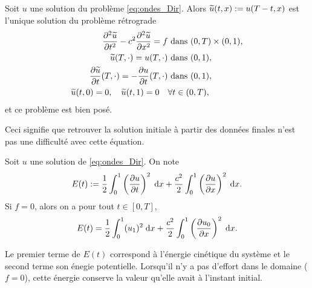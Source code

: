 \documentclass[12pt,a4paper,twoside]{article}
\begin{document}




\begin{proposition}
  Soit $u$ une solution du probl\`eme \eqref{eq:ondes_Dir}.
  Alors $\widetilde{u}(t,x) := u(T-t,x)$ est l'unique solution du probl\`eme
  r\'etrograde
  \begin{align*}
    \dfrac{\partial^2 \widetilde{u}}{\partial t^2} - c^2 \dfrac{\partial^2 \widetilde{u}}{\partial x^2} = f 
    &\text{ dans } (0,T) \times (0,1) ,
    \\
    \widetilde{u}(T,\cdot) = u(T,\cdot) 
    & \text{ dans } (0,1) ,
    \\
    \dfrac{\partial \widetilde{u}}{\partial t}(T,\cdot) = - \dfrac{\partial u}{\partial t}(T,\cdot) 
    & \text{ dans } (0,1) ,
    \\
    \widetilde{u}(t,0) = 0 , \quad \widetilde{u}(t,1) = 0 
    \quad& \forall t \in (0,T) ,
  \end{align*}
  et ce probl\`eme est bien pos\'e.
\end{proposition}
Ceci signifie que retrouver la solution initiale \`a partir des donn\'ees
finales n'est pas une difficult\'e avec cette \'equation.

\begin{proposition}
  \label{prop:ondes_energie}
  Soit $u$ une solution de \eqref{eq:ondes_Dir}.
  On note
  \begin{align*}
    E(t) := \dfrac{1}{2} \int_0^1 \left( \dfrac{\partial u}{\partial t}
    \right)^2 \;\mathrm{d} x + \dfrac{c^2}{2} \int_0^1 \left( \dfrac{\partial u}{\partial x}
    \right)^2 \;\mathrm{d} x .
  \end{align*}
  Si $f = 0$, alors on a pour tout $t \in [0,T]$,
  \begin{align*}
    E(t) = \dfrac{1}{2} \int_0^1 (u_1)^2 \;\mathrm{d} x
    + \dfrac{c^2}{2} \int_0^1 \left(\dfrac{\partial u_0}{\partial x} \right)^2 \;\mathrm{d} x .
  \end{align*}
\end{proposition}

Le premier terme de $E(t)$ correspond \`a l'\'energie
cin\'etique du syst\`eme et le second terme son \'enegie potentielle.
Lorsqu'il n'y a pas d'effort dans le domaine ($f=0$),
cette \'energie conserve la valeur qu'elle avait \`a l'instant initial.
\end{document}
